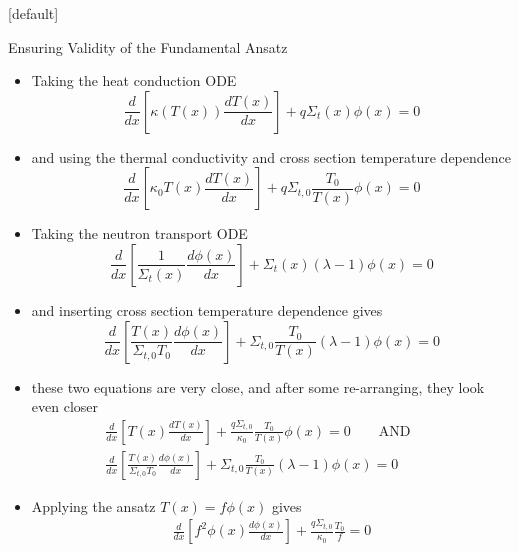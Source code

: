 \documentclass[9pt,t]{beamer}
\makeatletter
\newcommand{\QAND}{\qquad \text{AND} \qquad}
\newenvironment{withoutheadline}{
       \setbeamertemplate{headline}[default]
       \def\beamer@entrycode{\vspace*{-\headheight}}
    }{}
\makeatother
\begin{document}
\begin{withoutheadline}
\begin{frame}[allowframebreaks]{Ensuring Validity of the Fundamental Ansatz}
    \begin{itemize}
        \item Taking the heat conduction ODE
        \begin{equation}
            \frac{d}{dx}\left\lbrack\kappa(T(x))\frac{dT(x)}{dx}\right\rbrack + q \Sigma_{t}(x)\phi(x) = 0
        \end{equation}
        \item and using the thermal conductivity and cross section temperature dependence
        \begin{equation}
            \frac{d}{dx}\left\lbrack\kappa_{0} T(x)\frac{dT(x)}{dx}\right\rbrack + q\Sigma_{t,0}\frac{T_{0}}{T(x)}\phi(x) = 0
        \end{equation}
        \item Taking the neutron transport ODE
        \begin{equation}
            \frac{d}{dx}\left\lbrack\frac{1}{\Sigma_{t}(x)} \frac{d\phi(x)}{dx} \right\rbrack + \Sigma_{t}(x)
            \left(\lambda - 1\right)\phi(x) = 0
        \end{equation}
        \item and inserting cross section temperature dependence gives
        \begin{equation}
            \frac{d}{dx}\left\lbrack  \frac{T(x)}{\Sigma_{t,0}T_{0}} \frac{d\phi(x)}{dx} \right\rbrack + \Sigma_{t,0}\frac{T_{0}}{T(x)}
            \left(\lambda - 1\right)\phi(x) = 0
        \end{equation}
        \item these two equations are very close, and after some re-arranging, they look even closer
        \begin{multline}
            \frac{d}{dx}\left\lbrack T(x)\frac{dT(x)}{dx}\right\rbrack + \frac{q\Sigma_{t,0}}{\kappa_{0}}\frac{T_{0}}{T(x)}\phi(x) = 0
            \QAND \\
            \frac{d}{dx}\left\lbrack  \frac{T(x)}{\Sigma_{t,0}T_{0}} \frac{d\phi(x)}{dx} \right\rbrack + \Sigma_{t,0}\frac{T_{0}}{T(x)}
            \left(\lambda - 1\right)\phi(x) = 0
        \end{multline}
        \item Applying the ansatz $T(x) = f\phi(x)$ gives
        \begin{multline}
            \frac{d}{dx}\left\lbrack f^2\phi(x)\frac{d\phi(x)}{dx}\right\rbrack + \frac{q\Sigma_{t,0}}{\kappa_{0}}\frac{T_{0}}{f} = 0

\end{multline}
\end{itemize}
\end{frame}
\end{withoutheadline}
\end{document}
